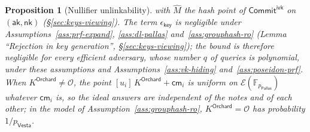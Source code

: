 \documentclass[11pt,a4paper]{article}
\newtheorem{proposition}[theorem]{Proposition}
\theoremstyle{definition}
\newcommand{\F}{\mathbb{F}}
\newcommand{\cmsym}{\mathsf{cm}}
\newcommand{\Pallas}{\ensuremath{\mathsf{Pallas}}}
\newcommand{\Vesta}{\ensuremath{\mathsf{Vesta}}}
\newcommand{\Ep}{\ensuremath{\mathcal{E}}}
\newcommand{\CommitIvk}{\ensuremath{\mathsf{Commit}^{\mathsf{ivk}}}}
\newcommand{\aksym}{\ensuremath{\mathsf{ak}}}
\newcommand{\nksym}{\ensuremath{\mathsf{nk}}}
\begin{document}
\begin{proposition}[Nullifier unlinkability]
with $\hat{M}$ the hash point of $\CommitIvk$ on $(\aksym, \nksym)$
(\S\ref{sec:keys-viewing}). The
term $\epsilon_{\mathsf{key}}$ is negligible under
Assumptions~\ref{ass:prf-expand}, \ref{ass:dl-pallas}
and~\ref{ass:grouphash-ro} (Lemma ``Rejection in key generation'',
\S\ref{sec:keys-viewing}); the bound is therefore negligible for every
efficient adversary, whose number $q$ of queries is polynomial, under these
assumptions and Assumptions~\ref{ass:vk-hiding} and~\ref{ass:poseidon-prf}.
When $K^{\mathsf{Orchard}} \neq \mathcal{O}$, the point
$[u_i]\,K^{\mathsf{Orchard}} + \cmsym_i$ is uniform on $\Ep(\F_{p_{\Pallas}})$
whatever $\cmsym_i$ is, so the ideal answers are independent of the notes
and of each other; in the model of
Assumption~\ref{ass:grouphash-ro}, $K^{\mathsf{Orchard}} = \mathcal{O}$ has
probability $1/p_{\Vesta}$.
\end{proposition}
\end{document}

